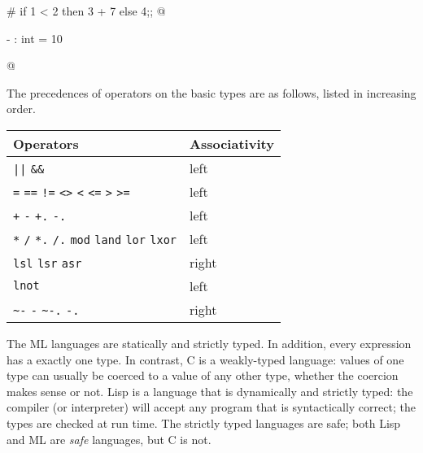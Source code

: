 \begin{ocaml}
# if 1 < 2 then
     3 + 7
  else
     4;;
@
\begin{topoutput}
- : int = 10
\end{topoutput}
@
\end{ocaml}


The precedences of operators on the basic types are as follows,
listed in increasing order.

\begin{center}
\newcommand\comma{\quad}
\begin{tabular}{l|l}
Operators                                                                            & Associativity\\
\hline
\hbox{\lstinline$||$}\comma{} \hbox{\lstinline$&&$}                                                          & left\\
\hbox{\lstinline$=$}\comma{} \hbox{\lstinline$==$}\comma{} \hbox{\lstinline$!=$}\comma{}
\hbox{\lstinline$<>$}\comma{} \hbox{\lstinline$<$}\comma{} \hbox{\lstinline$<=$}\comma{}
\hbox{\lstinline$>$}\comma{} \hbox{\lstinline$>=$}                                                           & left\\
\hbox{\lstinline$+$}\comma{} \hbox{\lstinline$-$}\comma{} \hbox{\lstinline$+.$}\comma{} \hbox{\lstinline$-.$}              & left\\
\hbox{\lstinline$*$}\comma{} \hbox{\lstinline$/$}\comma{} \hbox{\lstinline$*.$}\comma{} \hbox{\lstinline$/.$}\comma{}
\hbox{\lstinline$mod$}\comma{} \hbox{\lstinline$land$}\comma{} \hbox{\lstinline$lor$}\comma{} \hbox{\lstinline$lxor$}      & left\\
\hbox{\lstinline$lsl$}\comma{} \hbox{\lstinline$lsr$}\comma{} \hbox{\lstinline$asr$}                                & right\\
\hbox{\lstinline$lnot$}                                                                               & left\\
\hbox{\lstinline$~-$}\comma{} \hbox{\lstinline$-$}\comma{} \hbox{\lstinline$~-.$}\comma{} \hbox{\lstinline$-.$}            & right
\end{tabular}
\end{center}


The ML languages are statically and strictly typed.  In addition,
every expression has a exactly one type.  In contrast, C is a
weakly-typed language: values of one type can usually be coerced to a
value of any other type, whether the coercion makes sense or not.
Lisp is a language that is dynamically and strictly typed: the
compiler (or interpreter) will accept any program that is
syntactically correct; the types are checked at run time.  The
strictly typed languages are safe; both Lisp and ML are \emph{safe}
languages, but C is not.

